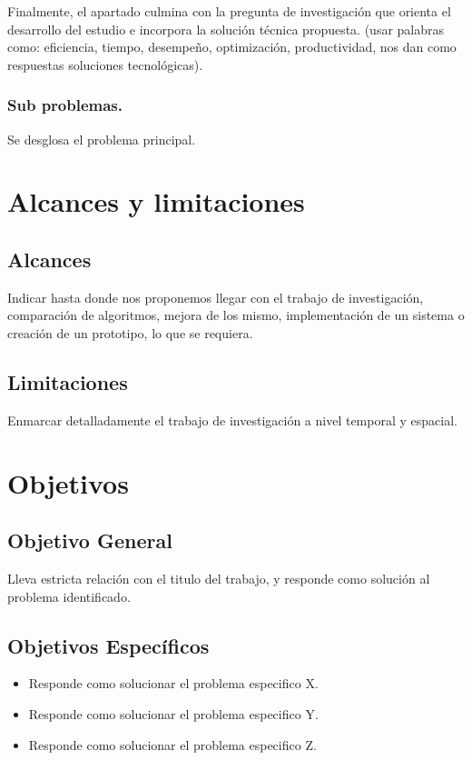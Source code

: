 Finalmente, el apartado culmina con la pregunta de investigación que orienta el desarrollo del estudio e incorpora la solución técnica propuesta. (usar palabras como: eficiencia, tiempo, desempeño, optimización, productividad, nos dan como respuestas soluciones tecnológicas).

\subsubsection{Sub problemas.}
Se desglosa el problema principal.


\section{Alcances y limitaciones}
\subsection{Alcances}
Indicar hasta donde nos proponemos llegar con el trabajo de investigación, comparación de algoritmos, mejora de los mismo, implementación de un sistema o creación de un prototipo, lo que se requiera.
\subsection{Limitaciones}
Enmarcar detalladamente el trabajo de investigación a nivel temporal y espacial.



\section{Objetivos}
\subsection{Objetivo General}
Lleva estricta relación con el titulo del trabajo, y responde como solución al problema identificado.

\subsection{Objetivos Específicos}
\begin{itemize}
	\item Responde como solucionar el problema especifico X.
	\item Responde como solucionar el problema especifico Y.
	\item Responde como solucionar el problema especifico Z.
\end{itemize}
